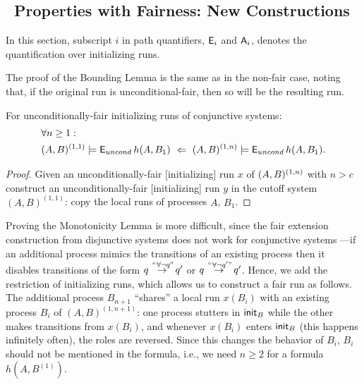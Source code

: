 \subsection{\LTLmX\ Properties with Fairness: New Constructions} \label{gua:sec:ideas-conj-fair}

In this section, subscript $i$ in path quantifiers, $\pexists_i$ and $\pforall_i$, 
denotes the quantification over initializing runs.

The proof of the Bounding Lemma is the same as in the non-fair case,
noting that, if the original run is unconditional-fair,
then so will be the resulting run.

\begin{lemma} \label{le:FairConjunctiveBounding Lemma}
For unconditionally-fair initializing runs of conjunctive systems:
\begin{align*}
&\forall n \geq 1:\\
& (A,B)^{(1,1)} \models \pexists_{uncond} h(A,B_1)
\ \Implied \
(A,B)^{(1,n)} \models \pexists_{uncond} h(A,B_1).
\end{align*}
\end{lemma}
\begin{proof}
Given an unconditionally-fair [initializing] run $x$ of $\largesys$ with $n>c$ construct an unconditionally-fair [initializing] run $y$ in the cutoff system $(A,B)^{(1,1)}$: copy the local runs of processes $A$, $B_1$.
\end{proof}

Proving the Monotonicity Lemma is more difficult,
since the fair extension construction from disjunctive 
systems does not work for conjunctive systems%
---if an additional process mimics the transitions of an existing process
   then it disables transitions of the form 
   $\transition{q}{q'}{\textit{``\,}\forall\neg q\textit{\!''}}$ or
   $\transition{q}{q'}{\textit{``\,}\forall\neg q'\textit{\!''}}$.
Hence, we add the restriction of initializing runs, 
which allows us to construct a fair run as follows.
The additional process $B_{n+1}$ ``shares'' a local run $x(B_i)$ 
with an existing process $B_i$ of $(A,B)^{(1,n+1)}$: 
one process stutters in $\init_B$ while the other makes transitions from $x(B_i)$, 
and whenever $x(B_i)$ enters $\init_B$
(this happens infinitely often),
the roles are reversed. 
Since this changes the behavior of $B_i$, 
$B_i$ should not be mentioned in the formula, 
i.e., we need $n\geq 2$ for a formula $h(A,B^{(1)})$. 

